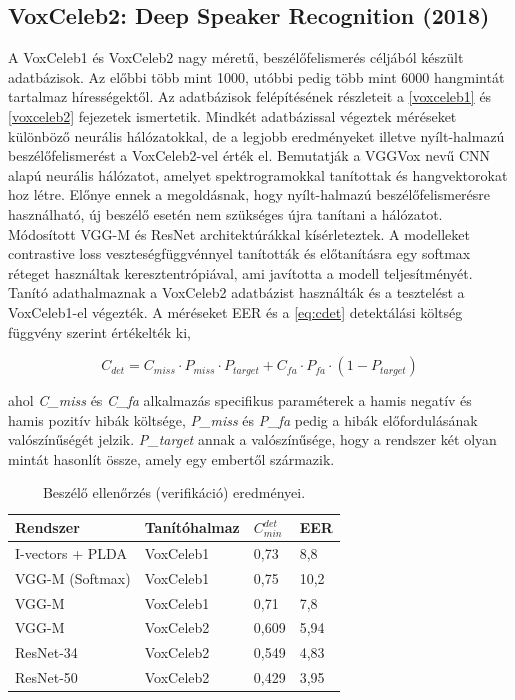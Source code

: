\subsection{VoxCeleb2: Deep Speaker Recognition (2018)}

A VoxCeleb1 és VoxCeleb2 nagy méretű, beszélőfelismerés céljából készült adatbázisok. Az előbbi több mint 1000, utóbbi pedig több mint 6000 hangmintát tartalmaz hírességektől. Az adatbázisok felépítésének részleteit a \ref{voxceleb1} és \ref{voxceleb2} fejezetek ismertetik. Mindkét adatbázissal végeztek méréseket különböző neurális hálózatokkal, de a legjobb eredményeket illetve nyílt-halmazú beszélőfelismerést a VoxCeleb2-vel érték el.
\newline
\newline
Bemutatják a VGGVox nevű CNN alapú neurális hálózatot, amelyet spektrogramokkal tanítottak és hangvektorokat hoz létre. Előnye ennek a megoldásnak, hogy nyílt-halmazú beszélőfelismerésre használható, új beszélő esetén nem szükséges újra tanítani a hálózatot. 
\newline
\newline
Módosított VGG-M és ResNet architektúrákkal kísérleteztek. A modelleket contrastive loss veszteségfüggvénnyel tanították és előtanításra egy softmax réteget használtak keresztentrópiával, ami javította a modell teljesítményét. Tanító adathalmaznak a VoxCeleb2 adatbázist használták és a tesztelést a VoxCeleb1-el végezték. A méréseket EER és a \ref{eq:cdet} detektálási költség függvény szerint értékelték ki,

\begin{equation} \label{eq:cdet}
C_{det} = C_{miss} \cdot P_{miss} \cdot P_{target} + C_{fa} \cdot P_{fa} \cdot (1 - P_{target})
\end{equation}

ahol \emph{C\_miss} és \emph{C\_fa} alkalmazás specifikus paraméterek a hamis negatív és hamis pozitív hibák költsége, \emph{P\_miss} és \emph{P\_fa} pedig a hibák előfordulásának valószínűségét jelzik. \emph{P\_target} annak a valószínűsége, hogy a rendszer két olyan mintát hasonlít össze, amely egy embertől származik.
\newline
\begin{table}[!ht]
	\begin{tabular}{*4l} \toprule
		\bfseries Rendszer & \bfseries Tanítóhalmaz & \bfseries $C_{min}^{det}$ & \bfseries EER \\ \midrule
		I-vectors + PLDA & VoxCeleb1 & 0,73 & 8,8 \\
		VGG-M (Softmax) & VoxCeleb1 & 0,75 & 10,2 \\
		VGG-M & VoxCeleb1 & 0,71 & 7,8 \\
		VGG-M  & VoxCeleb2 & 0,609 & 5,94 \\
		ResNet-34 & VoxCeleb2 & 0,549 & 4,83 \\
		ResNet-50 & VoxCeleb2 & 0,429 & 3,95 \\
		\bottomrule
		\hline
	\end{tabular}
	\centering
	\caption{Beszélő ellenőrzés (verifikáció) eredményei.}
	\label{fig:sincnet-verification}
\end{table}

